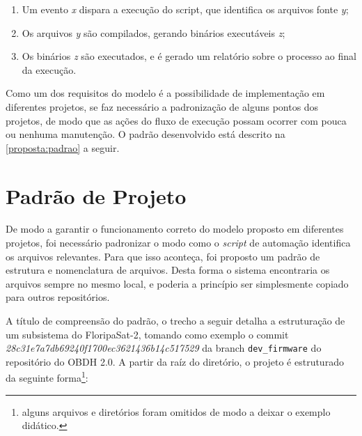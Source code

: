 \begin{enumerate}
    \item Um evento \textit{x} dispara a execução do script, que identifica os arquivos fonte \textit{y};
    \item Os arquivos \textit{y} são compilados, gerando binários executáveis \textit{z};
    \item Os binários \textit{z} são executados, e é gerado um relatório sobre o processo ao final da execução.
\end{enumerate}

Como um dos requisitos do modelo é a possibilidade de implementação em diferentes projetos, se faz necessário a padronização de alguns pontos dos projetos, de modo que as ações do fluxo de execução possam ocorrer com pouca ou nenhuma manutenção. O padrão desenvolvido está descrito na \autoref{proposta:padrao} a seguir.


\section{Padrão de Projeto}
\label{proposta:padrao}

De modo a garantir o funcionamento correto do modelo proposto em diferentes projetos, foi necessário padronizar o modo como o \textit{script} de automação identifica os arquivos relevantes. Para que isso aconteça, foi proposto um padrão de estrutura e nomenclatura de arquivos. Desta forma o sistema encontraria os arquivos sempre no mesmo local, e poderia a princípio ser simplesmente copiado para outros repositórios.

A título de compreensão do padrão, o trecho a seguir detalha a estruturação de um subsistema do FloripaSat-2, tomando como exemplo o commit \\ \textit{28c31e7a7db69240f1700ec3621436b14c517529} da branch \texttt{dev\_firmware} do repositório do OBDH 2.0\cite{obdh2-github}. A partir da raíz do diretório, o projeto é estruturado da seguinte forma\footnote{alguns arquivos e diretórios foram omitidos de modo a deixar o exemplo didático.}:

